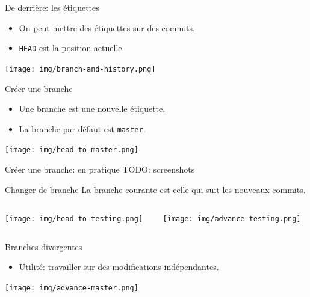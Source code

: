\documentclass{beamer}
\begin{document}
\begin{frame}{De derrière: les étiquettes}
    \begin{itemize}
        \item On peut mettre des étiquettes sur des commits.
        \item \texttt{HEAD} est la position actuelle.
    \end{itemize}
    \texttt{[image: img/branch-and-history.png]}
\end{frame}

\begin{frame}{Créer une branche}
    \begin{itemize}
        \item Une branche est une nouvelle étiquette.
        \item La branche par défaut est \texttt{master}.
    \end{itemize}
    \begin{center}
        \texttt{[image: img/head-to-master.png]}
    \end{center}
\end{frame}

\begin{frame}{Créer une branche: en pratique}
    TODO: screenshots
\end{frame}

\begin{frame}{Changer de branche}
    La branche courante est celle qui suit les nouveaux commits.
    \begin{columns}
        \begin{column}{0.44\textwidth}
            \begin{center}
                \texttt{[image: img/head-to-testing.png]}
            \end{center}
        \end{column}
        \begin{column}{0.54\textwidth}
            \texttt{[image: img/advance-testing.png]}
        \end{column}
    \end{columns}
\end{frame}


\begin{frame}{Branches divergentes}
    \begin{itemize}
        \item Utilité: travailler sur des modifications indépendantes.
    \end{itemize}
    \begin{center}
        \texttt{[image: img/advance-master.png]}
    \end{center}
\end{frame}
\end{document}
